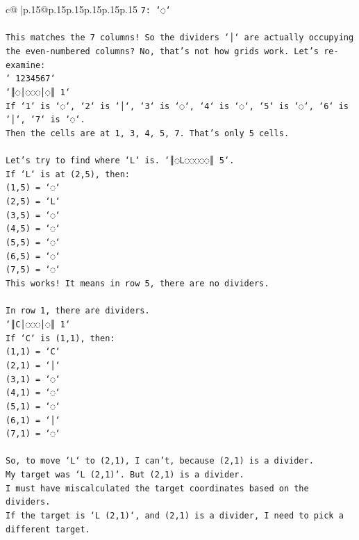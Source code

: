 \documentclass{article}
\begin{document}
{\begin{supertabular}{c@{$\;$}|p{.15\linewidth}@{}p{.15\linewidth}p{.15\linewidth}p{.15\linewidth}p{.15\linewidth}p{.15\linewidth}}
{{{\texttt{7: `◌`} \\
\\ 
\texttt{This matches the 7 columns! So the dividers `│` are actually occupying the even{-}numbered columns? No, that's not how grids work. Let's re{-}examine:} \\
\texttt{` 1234567`} \\
\texttt{`║◌│◌◌◌│◌║ 1`} \\
\texttt{If `1` is `◌`, `2` is `│`, `3` is `◌`, `4` is `◌`, `5` is `◌`, `6` is `│`, `7` is `◌`.} \\
\texttt{Then the cells are at 1, 3, 4, 5, 7. That's only 5 cells.} \\
\\ 
\texttt{Let's try to find where `L` is. `║◌L◌◌◌◌◌║ 5`.} \\
\texttt{If `L` is at (2,5), then:} \\
\texttt{(1,5) = `◌`} \\
\texttt{(2,5) = `L`} \\
\texttt{(3,5) = `◌`} \\
\texttt{(4,5) = `◌`} \\
\texttt{(5,5) = `◌`} \\
\texttt{(6,5) = `◌`} \\
\texttt{(7,5) = `◌`} \\
\texttt{This works! It means in row 5, there are no dividers.} \\
\\ 
\texttt{In row 1, there are dividers.} \\
\texttt{`║C│◌◌◌│◌║ 1`} \\
\texttt{If `C` is (1,1), then:} \\
\texttt{(1,1) = `C`} \\
\texttt{(2,1) = `│`} \\
\texttt{(3,1) = `◌`} \\
\texttt{(4,1) = `◌`} \\
\texttt{(5,1) = `◌`} \\
\texttt{(6,1) = `│`} \\
\texttt{(7,1) = `◌`} \\
\\ 
\texttt{So, to move `L` to (2,1), I can't, because (2,1) is a divider.} \\
\texttt{My target was `L (2,1)`. But (2,1) is a divider.} \\
\texttt{I must have miscalculated the target coordinates based on the dividers.} \\
\texttt{If the target is `L (2,1)`, and (2,1) is a divider, I need to pick a different target.} \\
}}}
\end{supertabular}}
\end{document}
